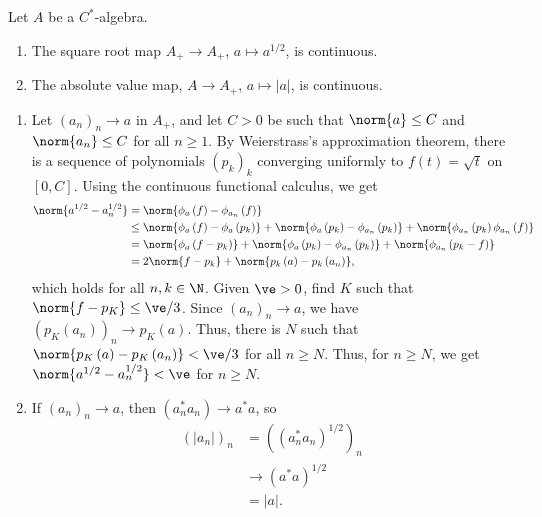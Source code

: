 \documentclass[10pt]{mypackage}
\begin{document}
\begin{proposition}
  Let $A$ be a $C^{\ast}$-algebra.
  \begin{enumerate}[(1)]
    \item The square root map $A_{+}\rightarrow A_{+}$, $a \mapsto a^{1/2}$, is continuous.
    \item The absolute value map, $A\rightarrow A_{+}$, $a \mapsto \left\vert a \right\vert$, is continuous.
  \end{enumerate}
\end{proposition}
\begin{solution}\hfill
  \begin{enumerate}[(1)]
    \item Let $\left(a_n\right)_n\rightarrow a$ in $A_{+}$, and let $C > 0$ be such that $\norm{a}\leq C$ and $\norm{a_n}\leq C$ for all $n\geq 1$. By Weierstrass's approximation theorem, there is a sequence of polynomials $\left(p_k\right)_k$ converging uniformly to $f(t) = \sqrt{t}$ on $\left[0,C\right]$. Using the continuous functional calculus, we get
      \begin{align*}
        \norm{a^{1/2} - a_n^{1/2}} &= \norm{\phi_a\left(f\right) - \phi_{a_n}\left(f\right)}\\
                                   &\leq \norm{\phi_a\left(f\right) - \phi_a\left(p_k\right)} + \norm{\phi_a\left(p_k\right) - \phi_{a_n}\left(p_k\right)} + \norm{\phi_{a_n}\left(p_k\right) \phi_{a_n}\left(f\right)}\\
                                   &= \norm{\phi_a\left(f - p_k\right)} + \norm{\phi_a\left(p_k\right) - \phi_{a_n}\left(p_k\right)} + \norm{\phi_{a_n}\left(p_k - f\right)}\\
                                   &= 2\norm{f - p_k} + \norm{p_k\left(a\right) - p_k\left(a_n\right)},
      \end{align*}
      which holds for all $n,k\in \N$. Given $\ve > 0$, find $K$ such that $\norm{f - p_K} \leq \ve/3$. Since $\left(a_n\right)_n\rightarrow a$, we have $\left(p_K\left(a_n\right)\right)_n\rightarrow p_K\left(a\right)$. Thus, there is $N$ such that $\norm{p_K\left(a\right) - p_K\left(a_n\right)} < \ve/3$ for all $n\geq N$. Thus, for $n\geq N$, we get $\norm{a^{1/2} - a_n^{1/2}} < \ve$ for $n\geq N$.
    \item If $\left(a_n\right)_n\rightarrow a$, then $\left(a_n^{\ast}a_n\right) \rightarrow a^{\ast}a$, so
      \begin{align*}
        \left(\left\vert a_n \right\vert\right)_n &= \left(\left(a_n^{\ast}a_n\right)^{1/2}\right)_n\\
                                                  &\rightarrow \left(a^{\ast}a\right)^{1/2}\\
                                                  &= \left\vert a \right\vert.
      \end{align*}
  \end{enumerate}
\end{solution}
\end{document}
